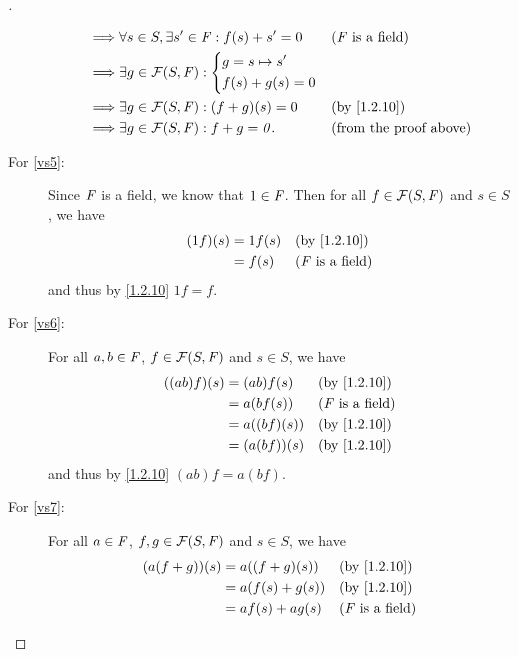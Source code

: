 \begin{proof}[]
\begin{description}
\begin{align*}
        \implies & \forall s \in S, \exists s' \in \F : f(s) + s' = 0 &  & \text{(\(\F\) is a field)}    \\
        \implies & \exists g \in \FS : \begin{dcases}
                                         g = s \mapsto s' \\
                                         f(s) + g(s) = 0
                                       \end{dcases}                                                  \\
        \implies & \exists g \in \FS : (f + g)(s) = 0                 &  & \by{1.2.10}                   \\
        \implies & \exists g \in \FS : f + g = \zv.                   &  & \text{(from the proof above)}
      \end{align*}
    \item[For \ref{vs5}:]
      Since \(\mathit{F}\) is a field, we know that \(1 \in \mathit{F}\).
      Then for all \(f \in \mathcal{F}(S, \mathit{F})\) and \(s \in S\), we have
      \begin{align*}
        (1f)(s) & = 1f(s) &  & \by{1.2.10}                \\
                & = f(s)  &  & \text{(\(\F\) is a field)}
      \end{align*}
      and thus by \cref{1.2.10} \(1f = f\).
    \item[For \ref{vs6}:]
      For all \(a, b \in \mathit{F}\), \(f \in \mathcal{F}(S, \mathit{F})\) and \(s \in S\), we have
      \begin{align*}
        ((ab) f)(s) & = (ab) f(s)   &  & \by{1.2.10}                \\
                    & = a (b f(s))  &  & \text{(\(\F\) is a field)} \\
                    & = a ((bf)(s)) &  & \by{1.2.10}                \\
                    & = (a (bf))(s) &  & \by{1.2.10}
      \end{align*}
      and thus by \cref{1.2.10} \((ab) f = a (bf)\).
    \item[For \ref{vs7}:]
      For all \(a \in \mathit{F}\), \(f, g \in \mathcal{F}(S, \mathit{F})\) and \(s \in S\), we have
      \begin{align*}
        (a (f + g))(s) & = a ((f + g)(s))    &  & \by{1.2.10}                \\
                       & = a (f(s) + g(s))   &  & \by{1.2.10}                \\
                       & = af(s) + ag(s)     &  & \text{(\(\F\) is a field)} \\

\end{align*}
\end{description}
\end{proof}
